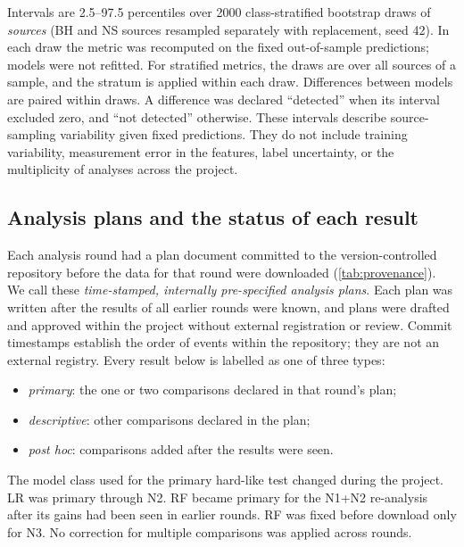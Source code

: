 \documentclass[11pt,a4paper]{article}
\begin{document}
Intervals are 2.5--97.5 percentiles over 2000 class-stratified bootstrap draws of \emph{sources} (BH and NS sources
resampled separately with replacement, seed 42). In each draw the metric was recomputed on the fixed out-of-sample
predictions; models were not refitted. For stratified metrics, the draws are over all sources of a sample, and the
stratum is applied within each draw. Differences between models are paired within draws. A difference was declared
``detected'' when its interval excluded zero, and ``not detected'' otherwise. These intervals describe source-sampling
variability given fixed predictions. They do not include training variability, measurement error in the features,
label uncertainty, or the multiplicity of analyses across the project.

\subsection{Analysis plans and the status of each result}\label{sec:prereg}
Each analysis round had a plan document committed to the version-controlled repository before the data for that round
were downloaded (\cref{tab:provenance}). We call these \emph{time-stamped, internally pre-specified analysis plans}. Each
plan was written after the results of all earlier rounds were known, and plans were drafted and approved within the
project without external registration or review. Commit timestamps establish the order of events within the repository;
they are not an external registry. Every result below is labelled as one of three types:
\begin{itemize}\setlength\itemsep{1pt}
\item \emph{primary}: the one or two comparisons declared in that round's plan;
\item \emph{descriptive}: other comparisons declared in the plan;
\item \emph{post hoc}: comparisons added after the results were seen.
\end{itemize}
The model class used for the primary hard-like test changed during the project. LR was primary through N2. RF became
primary for the N1+N2 re-analysis after its gains had been seen in earlier rounds. RF was fixed before download only for
N3. No correction for multiple comparisons was applied across rounds.
\end{document}
